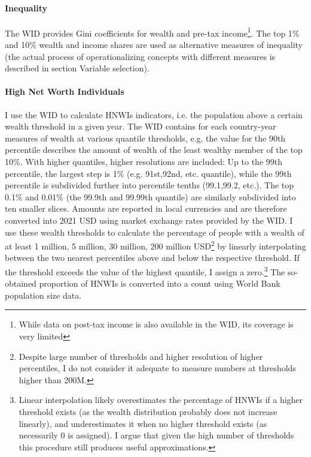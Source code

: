 \documentclass[11pt]{article}
\begin{document}
\paragraph*{Inequality}

The WID provides Gini coefficients for wealth and pre-tax income\footnote{While data on post-tax income is also available in the WID, its coverage is very limited}.
The top 1\% and 10\% wealth and income shares are used as alternative measures of inequality (the actual process of operationalizing concepts with different measures is described in section Variable selection).


\paragraph*{High Net Worth Individuals}

I use the WID to calculate HNWIs indicators, i.e. the population above a certain wealth threshold in a given year. 
The WID contains for each country-year measures of wealth at various quantile thresholds, e.g. the value for the 90th percentile describes the amount of wealth of the least wealthy member of the top 10\%.
With higher quantiles, higher resolutions are included: Up to the 99th percentile, the largest step is 1\% (e.g. 91st,92nd, etc. quantile), while the 99th percentile is subdivided further into percentile tenths (99.1,99.2, etc.).
The top 0.1\% and 0.01\% (the 99.9th and 99.99th quantile) are similarly subdivided into ten smaller slices.
Amounts are reported in local currencies and are therefore converted into 2021 USD using market exchange rates provided by the WID.
I use these wealth thresholds to calculate the percentage of people with a wealth of at least 1 million, 5 million, 30 million, 200 million USD\footnote{Despite large number of thresholds and higher resolution of higher percentiles, I do not consider it adequate to measure numbers at thresholds higher than 200M.} by linearly interpolating between the two nearest percentiles above and below the respective threshold.
If the threshold exceeds the value of the highest quantile, I assign a zero.\footnote{Linear interpolation likely overestimates the percentage of HNWIs if a higher threshold exists (as the wealth distribution probably does not increase linearly), and underestimates it when no higher threshold exists (as necessarily 0 is assigned). I argue that given the high number of thresholds this procedure still produces useful approximations.}
The so-obtained proportion of HNWIs is converted into a count using World Bank population size data.
\end{document}
